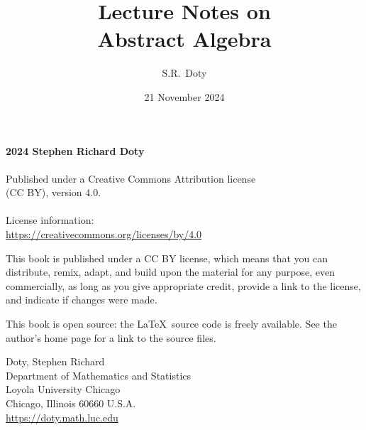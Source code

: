 \documentclass[11pt,oneside]{book}
\title{\bf\Huge Lecture Notes on\\Abstract Algebra}
\author{\Large S.R.~Doty}
\date{\large 21 November 2024}
\theoremstyle{definition}
\numberwithin{equation}{section}
\begin{document}
\maketitle

\thispagestyle{empty}
\begingroup
\parindent 0pt
\parskip \baselineskip

\vskip 1in

\begin{center}
\textcopyright{} \textbf{2024 Stephen Richard Doty}\\
\ \\  
Published under a Creative Commons 
Attribution license\\
(CC BY), version 4.0.\\
{\ } \\ 
License information:\\
\url{https://creativecommons.org/licenses/by/4.0}\\
\end{center}

\vfill

This book is published under a CC BY license, which means that you can
distribute, remix, adapt, and build upon the material for any purpose,
even commercially, as long as you give appropriate credit, provide a
link to the license, and indicate if changes were made.

This book is open source: the \LaTeX\ source code is freely available.
See the author's home page for a link to the source files.



\vfill


Doty, Stephen Richard\\
Department of Mathematics and Statistics \\
Loyola University Chicago \\
Chicago, Illinois 60660 U.S.A.\\
\url{https://doty.math.luc.edu}\\


\endgroup
\clearpage


\frontmatter

\tableofcontents  %
\end{document}
